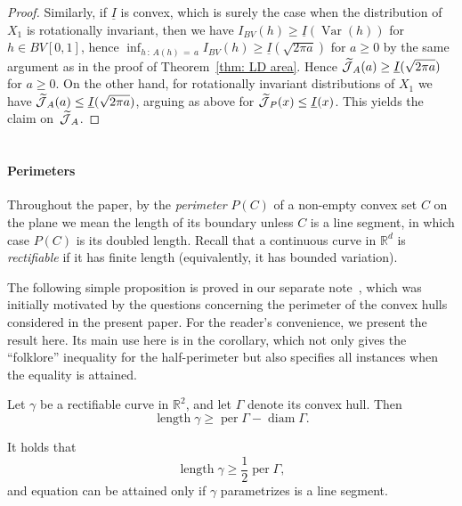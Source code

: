 \documentclass[10pt]{amsart}
\theoremstyle{definition}\newtheorem{defi}[theo]{Definition}\newtheorem{rema}[theo]{Remark}\newtheorem{exam}[theo]{Example}\newtheorem{exem}[theo]{Example}\newtheorem{nota}[theo]{Notation}
\DeclareMathOperator{\per}{per}
\DeclareMathOperator{\length}{length}
\DeclareMathOperator{\diam}{diam}
\newcommand{\ubar}[1]{\underline{#1}}
\newcommand{\Rbb}{\mathbb{R}}
\newcommand{\Jcl}{\mathcal{J}}
\newcommand{\Var}{\mathop{\mathrm{Var}}\nolimits}
\let\oldtilde\tilde
\renewcommand*{\tilde}[1]{\mathchoice{\widetilde{#1}}{\widetilde{#1}}{\oldtilde{#1}}{\oldtilde{#1}}}
\begin{document}
\begin{proof}
Similarly, if $\ubar I$ is convex, which is surely the case when the distribution of $X_1$ is rotationally invariant, then we have $I_{BV}(h) \ge \ubar I(\Var(h))$ for $h \in BV[0,1]$, hence $\inf_{h\,:\,A(h)\,=\,a} I_{BV}(h) \ge \ubar I (\sqrt{2 \pi a})$ for $a \ge 0$ by the same argument as in the proof of Theorem~\ref{thm: LD area}. Hence $\tilde{\Jcl}_A(a) \ge \ubar I (\sqrt{2 \pi a})$ for $a \ge 0$. On the other hand, for rotationally invariant distributions of $X_1$ we have $\tilde{\Jcl}_A(a) \le \ubar I (\sqrt{2 \pi a})$, arguing as above for $\tilde{\Jcl}_P(x) \le \ubar I(x)$. This yields the claim on~$\tilde{\Jcl}_A $.
\end{proof}

\appendix
\section{}
\paragraph{Perimeters}

Throughout the paper, by the \emph{perimeter} $P(C)$ of a non-empty convex set $C$ on the plane we mean the length of its boundary unless $C$ is a line segment, in which case $P(C)$ is its doubled length. Recall that a continuous curve in $\Rbb^d$ is \emph{rectifiable} if it has finite length (equivalently, it has bounded variation).

The following simple proposition is proved in our separate note~\cite{AkopyanVysotskyGeometry}, which was initially motivated by the questions concerning the perimeter of the convex hulls considered in the present paper. For the reader's convenience, we present the result here. Its main use here is in the corollary, which not only gives the ``folklore'' inequality for the half-perimeter but also specifies all instances when the equality is attained.


\begin{prop}\label{prop:length of curve}
Let $\gamma$ be a rectifiable curve in $\Rbb^2$, and let $\Gamma$ denote its convex hull. Then
\[
\length \gamma \geq \per \Gamma - \diam \Gamma.
\]
\end{prop}

\goodbreak
\begin{coro}\label{cor:length of curve}
It holds that
\[
\length \gamma \geq \frac12 \per \Gamma,
\]
and equation can be attained only if $\gamma$ parametrizes is a line segment.
\end{coro}
\end{document}
